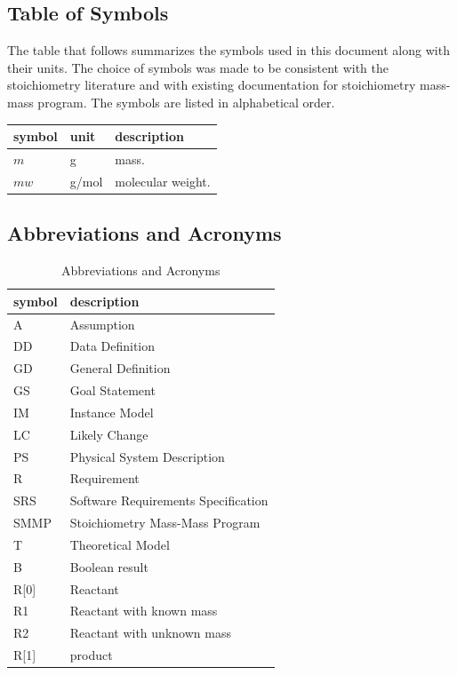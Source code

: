 \documentclass[12pt]{article}
\begin{document}
\subsection{Table of Symbols}

The table that follows summarizes the symbols used in this document along with
their units. The choice of symbols was made to be consistent with the stoichiometry 
literature and with existing documentation for stoichiometry mass-mass program. The symbols are listed in alphabetical order.

\renewcommand{\arraystretch}{1.2}
\noindent \begin{longtable*}{l l p{12cm}} \toprule
\endlastfoot
\textbf{symbol} & \textbf{unit} & \textbf{description}\\
\midrule 
$m$ & \si[per-mode=symbol] {\gram} & mass.\\
$mw$ & \si[per-mode=symbol] {\gram/\mol} & molecular weight.\\ 
\bottomrule
\end{longtable*}

\subsection{Abbreviations and Acronyms}

\renewcommand{\arraystretch}{1.2}
\begin{table}[ht]
\begin{tabular}{l l} 
  \toprule		
  \textbf{symbol} & \textbf{description}\\
  \midrule 
  A & Assumption\\
  DD & Data Definition\\
  GD & General Definition\\
  GS & Goal Statement\\
  IM & Instance Model\\
  LC & Likely Change\\
  PS & Physical System Description\\
  R & Requirement\\
  SRS & Software Requirements Specification\\
 SMMP & Stoichiometry Mass-Mass Program\\
  T & Theoretical Model\\
  B & Boolean result\\
  R[0] & Reactant \\
  R1 & Reactant with known mass\\
  R2 & Reactant with unknown mass\\
  R[1] & product \\
  \bottomrule
  \end{tabular}
  \caption{ Abbreviations and Acronyms}
 \end{table}
\end{document}
